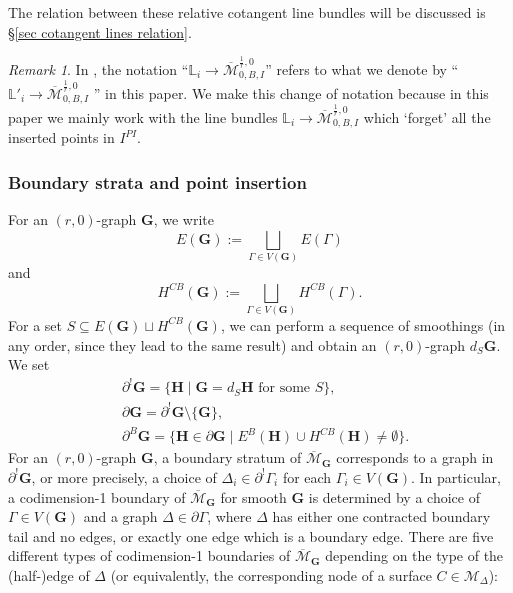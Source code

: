\documentclass[11pt]{amsart}
\theoremstyle{definition}
\theoremstyle{remark}
\newtheorem{rmk}[dummy]{Remark}
\newcommand{\<}{\left<}
\renewcommand{\>}{\right>}
\numberwithin{equation}{section}
\def\Mbar{{\overline{\mathcal M}}}
\begin{document}
 The relation between these relative cotangent line bundles will be discussed is \S \ref{sec cotangent lines relation}.

\begin{rmk}\label{rmk different notation for L in TZ}
    In \cite{TZ1,TZ2}, the notation ``$\mathbb L_i\to \Mbar^{\frac{1}{r},0}_{0,B,I}$'' refers to what we denote by ``$\mathbb L'_i\to \Mbar^{\frac{1}{r},0}_{0,B,I}$ '' in this paper. We make this change of notation because in this paper we mainly work with the line bundles $\mathbb L_i\to \Mbar^{\frac{1}{r},0}_{0,B,I}$ which `forget' all the inserted points in $I^{PI}$. 
\end{rmk}


\subsubsection{Boundary strata and point insertion}
For an $(r,0)$-graph $\bm{G}$, 
we write
$$
E(\bm{G}):=\bigsqcup_{\Gamma\in V(\bm{G})} E(\Gamma)
$$
and 
$$
H^{CB}(\bm{G}):= \bigsqcup_{\Gamma\in V(\bm{G})}  H^{CB}(\Gamma).
$$
For a set 
$S\subseteq E(\bm{G})\sqcup H^{CB}(\bm{G})$, 
we can perform a sequence of smoothings (in any order, since they lead to the same result) and obtain an $(r,0)$-graph $d_S \bm{G}$.  We set
\begin{align*}
&\partial^!\bm{G} = \{\bm{H} \; | \; \bm{G} = d_S\bm{H} \text{ for some } S\},\\
&\partial \bm{G} = \partial^!\bm{G} \setminus \{\bm{G}\},\\
&\partial^B \bm{G} = \{\bm{H} \in \partial \bm{G} \; | \; E^B(\bm{H}) \cup H^{CB}(\bm{H}) \neq \emptyset\}.
\end{align*}
For an $(r,0)$-graph $\mathbf{G}$, a boundary stratum of $\Mbar_\mathbf{G}$ corresponds to a graph in $\partial^!\mathbf{G}$, or more precisely, a choice of $\Delta_i\in \partial^! \Gamma_{i}$ for each $\Gamma_i\in V(\mathbf{G})$. In particular, a codimension-1 boundary of $\Mbar_\mathbf{G}$ for smooth $\mathbf{G}$ is determined by a choice of $\Gamma\in V(\mathbf{G})$ and a graph $\Delta \in \partial \Gamma$, where $\Delta$ has either one contracted boundary tail and no edges, or exactly one edge which is a boundary edge. There are five different types of codimension-1 boundaries of $\Mbar_\mathbf{G}$ depending on the type of the (half-)edge of $\Delta$ (or equivalently, the corresponding node of a surface $C\in \mathcal M_\Delta$): 
\end{document}
